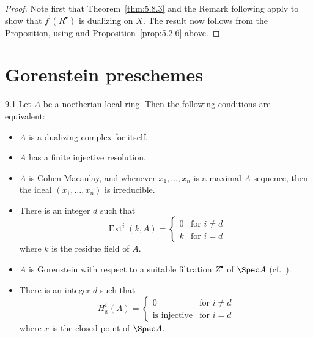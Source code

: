 \begin{proof}
Note first that Theorem~\ref{thm:5.8.3} and the Remark following apply to show that $f^{!}(R^\bullet)$ is dualizing on $X$. The result now follows from the Proposition, using  and Proposition~\ref{prop:5.2.6} above.
\end{proof}

\par\endgroup

\section{Gorenstein preschemes}\label{sec:5.9}
\begingroup
\setlength{\emergencystretch}{2em}

\begin{booktheorem}{9.1}\label{thm:5.9.1}
Let $A$ be a noetherian local ring. Then the following conditions are equivalent:
\begin{itemize}
\item[(i)] $A$ is a dualizing complex for itself.
\item[(ii)] $A$ has a finite injective resolution.
\item[(iii)] $A$ is Cohen-Macaulay, and whenever $x_1,\dots,x_n$ is a maximal $A$-sequence, then the ideal $(x_1,\dots,x_n)$ is irreducible.
\item[(iv)] There is an integer $d$ such that
\[
\operatorname{Ext}^{i}(k,A) = \begin{cases} 0 & \text{for } i\neq d \\ k & \text{for } i = d \end{cases}
\]
where $k$ is the residue field of $A$.
\item[(v)] $A$ is Gorenstein with respect to a suitable filtration $Z^{\bullet}$ of $\Spec A$ (cf.\ ).
\item[(vi)] There is an integer $d$ such that
\[
H_{x}^{i}(A) = \begin{cases} 0 & \text{for } i\neq d \\ \text{is injective} & \text{for } i = d \end{cases}
\]
where $x$ is the closed point of $\Spec A$.
\end{itemize}
\end{booktheorem}

